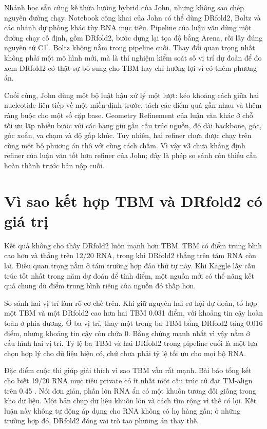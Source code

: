 \documentclass[12pt,a4paper,oneside]{report}
\newcommand{\cprime}{C1$^{\prime}$}
\begin{document}
Nhánh học sẵn cũng kế thừa hướng hybrid của John, nhưng không sao chép nguyên đường chạy.
Notebook công khai của John có thể dùng DRfold2, Boltz và các nhánh dự phòng khác tùy
RNA mục tiêu. Pipeline của luận văn dùng một đường chạy cố định, gồm DRfold2, bước dựng lại tọa
độ bằng Arena, rồi lấy đúng nguyên tử \cprime{}. Boltz không nằm trong pipeline cuối.
Thay đổi quan trọng nhất không phải một mô hình mới, mà là thí nghiệm kiểm soát số vị trí
dự đoán để đo xem DRfold2 có thật sự bổ sung cho TBM hay chỉ hưởng lợi vì có thêm phương án.

Cuối cùng, John dùng một bộ luật hậu xử lý một lượt: kéo khoảng cách giữa hai nucleotide
liên tiếp về một miền định trước, tách các điểm quá gần nhau và thêm ràng buộc cho một số
cặp base. Geometry Refinement của luận văn khác ở chỗ tối ưu lặp nhiều bước với các hạng
giữ gần cấu trúc nguồn, độ dài backbone, góc, góc xoắn, va chạm và độ gấp khúc. Tuy nhiên,
hai refiner chưa được chạy trên cùng một bộ phương án thô với cùng cách chấm. Vì vậy v3
chưa khẳng định refiner của luận văn tốt hơn refiner của John; đây là phép so sánh còn
thiếu cần hoàn thành trước bản nộp cuối.

\section{Vì sao kết hợp TBM và DRfold2 có giá trị}

Kết quả không cho thấy DRfold2 luôn mạnh hơn TBM. TBM có điểm trung bình cao hơn và thắng
trên 12/20 RNA, trong khi DRfold2 thắng trên tám RNA còn lại. Điều quan trọng nằm ở tám
trường hợp đảo thứ tự này. Khi Kaggle lấy cấu trúc tốt nhất trong năm dự đoán để tính điểm,
một nguồn mới có thể nâng kết quả chung dù điểm trung bình riêng của nguồn đó thấp hơn.

So sánh hai vị trí làm rõ cơ chế trên. Khi giữ nguyên hai cơ hội dự đoán, tổ hợp một TBM
và một DRfold2 cao hơn hai TBM 0.031 điểm, với khoảng tin cậy hoàn toàn ở phía dương. Ở
ba vị trí, thay một trong ba TBM bằng DRfold2 tăng 0.016 điểm, nhưng khoảng tin cậy còn
chứa 0. Bằng chứng mạnh nhất vì vậy nằm ở cấu hình hai vị trí. Tỷ lệ ba TBM và hai DRfold2
trong pipeline cuối là một lựa chọn hợp lý cho dữ liệu hiện có, chứ chưa phải tỷ lệ tối ưu
cho mọi bộ RNA.

Đặc điểm cuộc thi giúp giải thích vì sao TBM vẫn rất mạnh. Bài báo tổng kết cho biết 19/20
RNA mục tiêu private có ít nhất một cấu trúc cũ đạt TM-align trên 0.45 \cite{competition_paper}.
Nói đơn giản, phần lớn RNA ẩn có một khuôn tương đối giống trong kho dữ liệu. Một bản chụp dữ liệu
khuôn lớn và cách tìm rộng vì thế có lợi. Kết luận này không tự động áp dụng cho RNA không
có họ hàng gần; ở những trường hợp đó, DRfold2 đóng vai trò tạo phương án thay thế.
\end{document}
